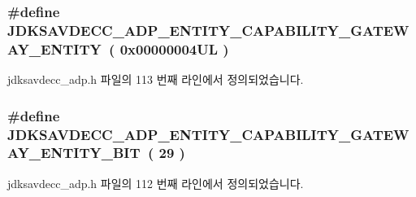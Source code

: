\subsubsection[{\texorpdfstring{J\+D\+K\+S\+A\+V\+D\+E\+C\+C\+\_\+\+A\+D\+P\+\_\+\+E\+N\+T\+I\+T\+Y\+\_\+\+C\+A\+P\+A\+B\+I\+L\+I\+T\+Y\+\_\+\+G\+A\+T\+E\+W\+A\+Y\+\_\+\+E\+N\+T\+I\+TY}{JDKSAVDECC_ADP_ENTITY_CAPABILITY_GATEWAY_ENTITY}}]{\setlength{\rightskip}{0pt plus 5cm}\#define J\+D\+K\+S\+A\+V\+D\+E\+C\+C\+\_\+\+A\+D\+P\+\_\+\+E\+N\+T\+I\+T\+Y\+\_\+\+C\+A\+P\+A\+B\+I\+L\+I\+T\+Y\+\_\+\+G\+A\+T\+E\+W\+A\+Y\+\_\+\+E\+N\+T\+I\+TY~( 0x00000004\+U\+L )}\hypertarget{group__adp__entity__capability_gab380f4a0bbcc1906ecfb1e9884e42b76}{}\label{group__adp__entity__capability_gab380f4a0bbcc1906ecfb1e9884e42b76}


jdksavdecc\+\_\+adp.\+h 파일의 113 번째 라인에서 정의되었습니다.

\subsubsection[{\texorpdfstring{J\+D\+K\+S\+A\+V\+D\+E\+C\+C\+\_\+\+A\+D\+P\+\_\+\+E\+N\+T\+I\+T\+Y\+\_\+\+C\+A\+P\+A\+B\+I\+L\+I\+T\+Y\+\_\+\+G\+A\+T\+E\+W\+A\+Y\+\_\+\+E\+N\+T\+I\+T\+Y\+\_\+\+B\+IT}{JDKSAVDECC_ADP_ENTITY_CAPABILITY_GATEWAY_ENTITY_BIT}}]{\setlength{\rightskip}{0pt plus 5cm}\#define J\+D\+K\+S\+A\+V\+D\+E\+C\+C\+\_\+\+A\+D\+P\+\_\+\+E\+N\+T\+I\+T\+Y\+\_\+\+C\+A\+P\+A\+B\+I\+L\+I\+T\+Y\+\_\+\+G\+A\+T\+E\+W\+A\+Y\+\_\+\+E\+N\+T\+I\+T\+Y\+\_\+\+B\+IT~( 29 )}\hypertarget{group__adp__entity__capability_ga45b980bdd0a8b228276add1c6d1e869d}{}\label{group__adp__entity__capability_ga45b980bdd0a8b228276add1c6d1e869d}


jdksavdecc\+\_\+adp.\+h 파일의 112 번째 라인에서 정의되었습니다.

